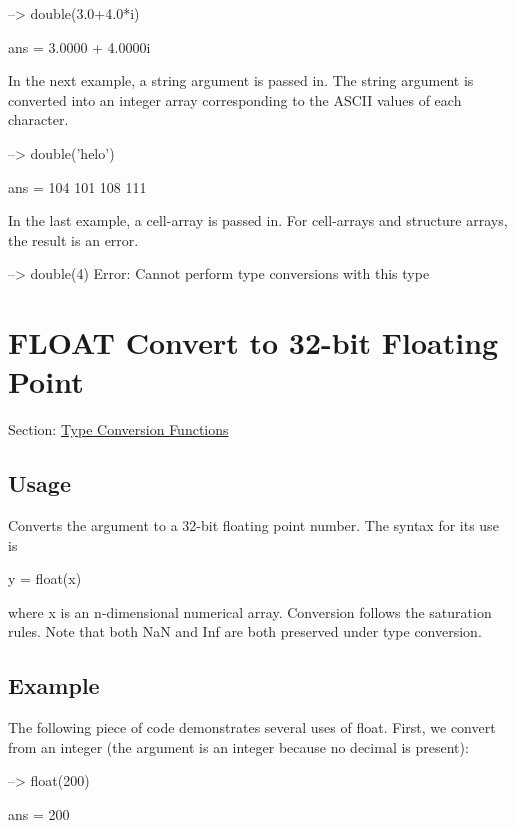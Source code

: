 \begin{DoxyVerbInclude}
--> double(3.0+4.0*i)

ans = 
   3.0000 +  4.0000i 
\end{DoxyVerbInclude}


In the next example, a string argument is passed in. The string argument is converted into an integer array corresponding to the A\-S\-C\-I\-I values of each character.


\begin{DoxyVerbInclude}
--> double('helo')

ans = 
 104 101 108 111 
\end{DoxyVerbInclude}


In the last example, a cell-\/array is passed in. For cell-\/arrays and structure arrays, the result is an error.


\begin{DoxyVerbInclude}
--> double({4})
Error: Cannot perform type conversions with this type
\end{DoxyVerbInclude}
 \hypertarget{typecast_float}{}\section{F\-L\-O\-A\-T Convert to 32-\/bit Floating Point}\label{typecast_float}
Section\-: \hyperlink{sec_typecast}{Type Conversion Functions} \hypertarget{vtkwidgets_vtkxyplotwidget_Usage}{}\subsection{Usage}\label{vtkwidgets_vtkxyplotwidget_Usage}
Converts the argument to a 32-\/bit floating point number. The syntax for its use is \begin{DoxyVerb}   y = float(x)
\end{DoxyVerb}
 where {\ttfamily x} is an {\ttfamily n}-\/dimensional numerical array. Conversion follows the saturation rules. Note that both {\ttfamily Na\-N} and {\ttfamily Inf} are both preserved under type conversion. \hypertarget{variables_struct_Example}{}\subsection{Example}\label{variables_struct_Example}
The following piece of code demonstrates several uses of {\ttfamily float}. First, we convert from an integer (the argument is an integer because no decimal is present)\-:


\begin{DoxyVerbInclude}
--> float(200)

ans = 
 200 
\end{DoxyVerbInclude}


